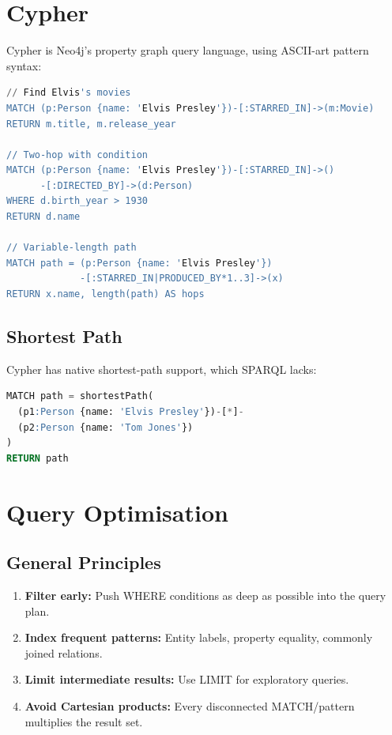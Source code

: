\documentclass[11pt,a4paper,oneside,openany]{book}
\theoremstyle{definition}
\theoremstyle{plain}
\theoremstyle{remark}
\begin{document}
\section{Cypher}\label{sec:cypher}

Cypher is Neo4j's property graph query language, using ASCII-art pattern syntax:

\begin{lstlisting}[language=SQL,numbers=none]
// Find Elvis's movies
MATCH (p:Person {name: 'Elvis Presley'})-[:STARRED_IN]->(m:Movie)
RETURN m.title, m.release_year

// Two-hop with condition
MATCH (p:Person {name: 'Elvis Presley'})-[:STARRED_IN]->()
      -[:DIRECTED_BY]->(d:Person)
WHERE d.birth_year > 1930
RETURN d.name

// Variable-length path
MATCH path = (p:Person {name: 'Elvis Presley'})
             -[:STARRED_IN|PRODUCED_BY*1..3]->(x)
RETURN x.name, length(path) AS hops
\end{lstlisting}

\subsection{Shortest Path}

Cypher has native shortest-path support, which SPARQL lacks:

\begin{lstlisting}[language=SQL,numbers=none]
MATCH path = shortestPath(
  (p1:Person {name: 'Elvis Presley'})-[*]-
  (p2:Person {name: 'Tom Jones'})
)
RETURN path
\end{lstlisting}

\section{Query Optimisation}\label{sec:query-opt}

\subsection{General Principles}

\begin{enumerate}
	\item \textbf{Filter early:} Push WHERE conditions as deep as possible into the query plan.
	\item \textbf{Index frequent patterns:} Entity labels, property equality, commonly joined relations.
	\item \textbf{Limit intermediate results:} Use LIMIT for exploratory queries.
	\item \textbf{Avoid Cartesian products:} Every disconnected MATCH/pattern multiplies the result set.
\end{enumerate}
\end{document}
